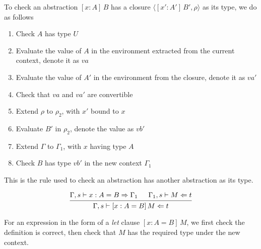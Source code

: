 \documentclass{article}
\theoremstyle{remark}
\begin{document}
To check an abstraction $[x : A] \, B$ has a closure $\langle [x' : A'] \, B', \rho \rangle$ as its type, we do as follows
\begin{enumerate}
\item Check $A$ has type $U$
\item Evaluate the value of $A$ in the environment extracted from the current context, denote it as $va$
\item Evaluate the value of $A'$ in the environment from the closure, denote it as $va'$
\item Check that $va$ and $va'$ are convertible
\item Extend $\rho$ to $\rho_2$, with $x'$ bound to $x$
\item Evaluate $B'$ in $\rho_2$, denote the value as $vb'$
\item Extend $\Gamma$ to $\Gamma_1$, with $x$ having type $A$
\item Check $B$ has type $vb'$ in the new context $\Gamma_1$
\end{enumerate}
This is the rule used to check an abstraction has another abstraction as its type.

\[
  \begin{prooftree}
    \hypo{\Gamma,s \vdash x : A = B \Rightarrow \Gamma_1}
    \hypo{\Gamma_1,s \vdash M \Leftarrow t}
    \infer2{\Gamma,s \vdash [x : A = B]\,M \Leftarrow t}
  \end{prooftree}
\]

For an expression in the form of a \emph{let} clause $[x : A = B] \, M$, we first check the definition is correct, then check that $M$ has the required type under the new context.



\end{document}

